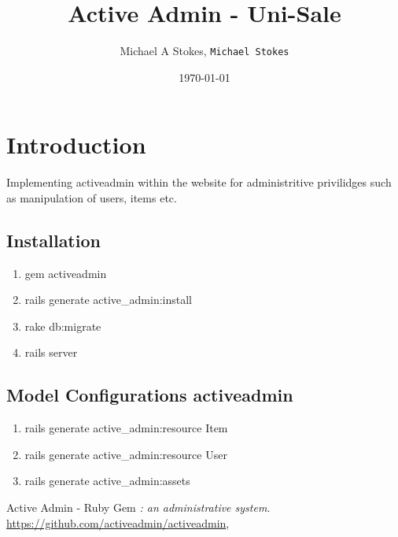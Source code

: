 \documentclass[11pt]{article}
\title{Active Admin - Uni-Sale}
\author{Michael A Stokes, \texttt{Michael Stokes}}
\date{\today}
\begin{document}
\maketitle

\section{Introduction}
Implementing activeadmin within the website for administritive
privilidges such as manipulation of users, items etc.

\subsection{Installation}

\begin{enumerate}
\item gem activeadmin
\item rails generate active\_admin:install
\item rake db:migrate
\item rails server
\end{enumerate}

\subsection{Model Configurations activeadmin}
\begin{enumerate}
\item rails generate active\_admin:resource Item
\item rails generate active\_admin:resource User
\item rails generate active\_admin:assets
\end{enumerate}

\begin{thebibliography}{9}

  Active Admin - Ruby Gem
  \emph{: an administrative system}.
  {\url{https://github.com/activeadmin/activeadmin}},
\end{thebibliography}
    
\end{document}
